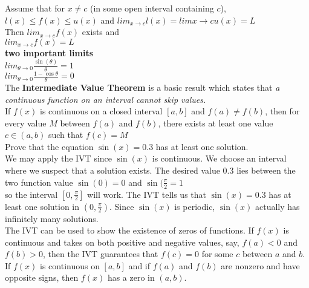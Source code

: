 \documentclass{article}
\begin{document}
	Assume that for $x \neq c$ (in some open interval containing $c$),\\

	$l(x) \leq f(x) \leq u(x)$ and $lim_{x \to c}l(x) = lim{x \to c}u(x) = L$\\

	Then $lim_{x \to c}f(x)$ exists and\\

	$lim_{x \to c}f(x) = L$\\

	\textbf{two important limits}\\
	$lim_{\theta \to 0}\frac{\sin(\theta)}{\theta} = 1$\\
	$lim_{\theta \to 0}\frac{1 - \cos{\theta}}{\theta} = 0$\\

	The \textbf{Intermediate Value Theorem} is a basic result which states that \textit{a continuous function on an interval cannot skip values.}\\
	
	If $f(x)$ is continuous on a closed interval $[a, b]$ and $f(a) \neq f(b)$, then for every value $M$ between $f(a)$ and $f(b)$, there exists at least one value $c \in (a, b)$ such that $f(c) = M$\\

	Prove that the equation $\sin(x) = 0.3$ has at least one solution.\\

	We may apply the IVT since $\sin(x)$ is continuous. We choose an interval where we suspect that a solution exists. The desired value 0.3 lies between the two function value $\sin(0) = 0$ and $\sin(\frac{\pi}{2} = 1$\\

	so the interval $[0 , \frac{\pi}{2}]$ will work. The IVT tells us that $\sin(x) = 0.3$ has at least one solution in $(0, \frac{\pi}{2})$. Since $\sin(x)$ is periodic, $\sin(x)$ actually has infinitely many solutions.\\

	The IVT can be used to show the existence of zeros of functions. If $f(x)$ is continuous and takes on both positive and negative values, say, $f(a) < 0$ and $f(b) > 0$, then the IVT guarantees that $f(c) = 0$ for some $c$ between $a$ and $b$.\\

	If $f(x)$ is continuous on $[a, b]$ and if $f(a)$ and $f(b)$ are nonzero and have opposite signs, then $f(x)$ has a zero in $(a, b)$.\\
\end{document}
